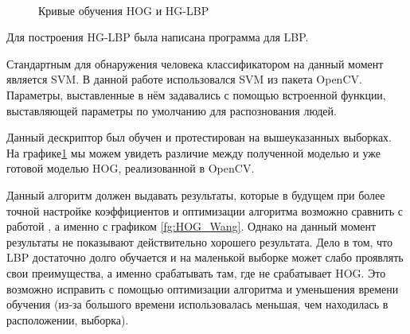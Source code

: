\documentclass[12pt,twoside]{article}
\begin{document}
\begin{figure}[H]
  \\
\caption{Кривые обучения HOG и HG-LBP}
\label{fg:Results_1}
\end{figure}

Для построения HG-LBP была написана программа для LBP.

Стандартным для обнаружения человека классификатором на данный момент является SVM. В данной работе использовался SVM из пакета OpenCV\cite{opencv}. Параметры, выставленные в нём задавались с помощью встроенной функции, выставляющей параметры по умолчанию для распознования людей.

Данный дескриптор был обучен и протестирован на вышеуказанных выборках. На графике\ref{fg:Results_1} мы можем увидеть различие между полученной моделью и уже готовой моделью HOG, реализованной в OpenCV.

Данный алгоритм должен выдавать результаты, которые в будущем при более точной настройке коэффициентов и оптимизации алгоритма возможно сравнить с работой \cite{Wang09}, а именно с графиком \ref{fg:HOG_Wang}. Однако на данный момент результаты не показывают действительно хорошего результата. Дело в том, что LBP достаточно долго обучается и на маленькой выборке может слабо проявлять свои преимущества, а именно срабатывать там, где не срабатывает HOG. Это возможно исправить с помощью оптимизации алгоритма и уменьшения времени обучения (из-за большого времени использовалась меньшая, чем находилась в расположении, выборка).
\end{document}
